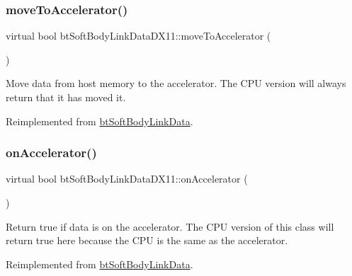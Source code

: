 \subsubsection{\texorpdfstring{move\+To\+Accelerator()}{moveToAccelerator()}\hspace{0.1cm}{\footnotesize\ttfamily [2/2]}}
{\footnotesize\ttfamily virtual bool bt\+Soft\+Body\+Link\+Data\+D\+X11\+::move\+To\+Accelerator (\begin{DoxyParamCaption}{ }\end{DoxyParamCaption})\hspace{0.3cm}{\ttfamily [virtual]}}

Move data from host memory to the accelerator. The C\+PU version will always return that it has moved it. 

Reimplemented from \hyperlink{classbtSoftBodyLinkData_a6cce268f804d465f3bc998771d3a7433}{bt\+Soft\+Body\+Link\+Data}.

\mbox{\label{classbtSoftBodyLinkDataDX11_a97835c62006c461555d41c61af626f17}} 
\subsubsection{\texorpdfstring{on\+Accelerator()}{onAccelerator()}\hspace{0.1cm}{\footnotesize\ttfamily [1/2]}}
{\footnotesize\ttfamily virtual bool bt\+Soft\+Body\+Link\+Data\+D\+X11\+::on\+Accelerator (\begin{DoxyParamCaption}{ }\end{DoxyParamCaption})\hspace{0.3cm}{\ttfamily [virtual]}}

Return true if data is on the accelerator. The C\+PU version of this class will return true here because the C\+PU is the same as the accelerator. 

Reimplemented from \hyperlink{classbtSoftBodyLinkData_ae284c2a182ddf82dde057a8c2eb17ac3}{bt\+Soft\+Body\+Link\+Data}.

\mbox{\label{classbtSoftBodyLinkDataDX11_a3138e6cb78bf8dac4786a3c45b26d5b8}} 
